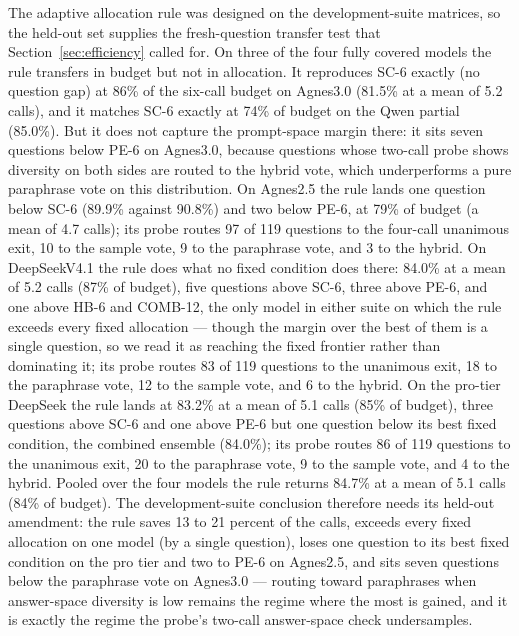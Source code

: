The adaptive allocation rule was designed on the development-suite matrices, so the held-out set supplies the fresh-question transfer test that Section~\ref{sec:efficiency} called for. On three of the four fully covered models the rule transfers in budget but not in allocation. It reproduces SC-6 exactly (no question gap) at 86\% of the six-call budget on Agnes3.0 (81.5\% at a mean of 5.2 calls), and it matches SC-6 exactly at 74\% of budget on the Qwen partial (85.0\%). But it does not capture the prompt-space margin there: it sits seven questions below PE-6 on Agnes3.0, because questions whose two-call probe shows diversity on both sides are routed to the hybrid vote, which underperforms a pure paraphrase vote on this distribution. On Agnes2.5 the rule lands one question below SC-6 (89.9\% against 90.8\%) and two below PE-6, at 79\% of budget (a mean of 4.7 calls); its probe routes 97 of 119 questions to the four-call unanimous exit, 10 to the sample vote, 9 to the paraphrase vote, and 3 to the hybrid. On DeepSeekV4.1 the rule does what no fixed condition does there: 84.0\% at a mean of 5.2 calls (87\% of budget), five questions above SC-6, three above PE-6, and one above HB-6 and COMB-12, the only model in either suite on which the rule exceeds every fixed allocation --- though the margin over the best of them is a single question, so we read it as reaching the fixed frontier rather than dominating it; its probe routes 83 of 119 questions to the unanimous exit, 18 to the paraphrase vote, 12 to the sample vote, and 6 to the hybrid. On the pro-tier DeepSeek the rule lands at 83.2\% at a mean of 5.1 calls (85\% of budget), three questions above SC-6 and one above PE-6 but one question below its best fixed condition, the combined ensemble (84.0\%); its probe routes 86 of 119 questions to the unanimous exit, 20 to the paraphrase vote, 9 to the sample vote, and 4 to the hybrid. Pooled over the four models the rule returns 84.7\% at a mean of 5.1 calls (84\% of budget). The development-suite conclusion therefore needs its held-out amendment: the rule saves 13 to 21 percent of the calls, exceeds every fixed allocation on one model (by a single question), loses one question to its best fixed condition on the pro tier and two to PE-6 on Agnes2.5, and sits seven questions below the paraphrase vote on Agnes3.0 --- routing toward paraphrases when answer-space diversity is low remains the regime where the most is gained, and it is exactly the regime the probe's two-call answer-space check undersamples.

